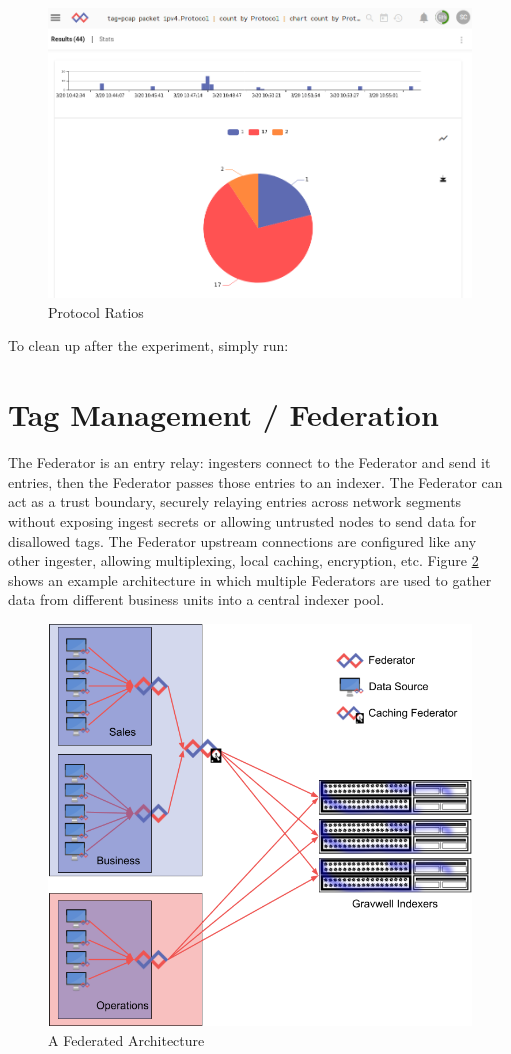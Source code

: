 \begin{figure}
	\includegraphics{images/igst-pcap-lab3.png}
	\caption{Protocol Ratios}
	\label{fig:pcap-lab3}
\end{figure}

To clean up after the experiment, simply run:



\section{Tag Management / Federation}
\label{sec:federator}

The Federator is an entry relay: ingesters connect to the Federator and
send it entries, then the Federator passes those entries to an indexer.
The Federator can act as a trust boundary, securely relaying entries
across network segments without exposing ingest secrets or allowing
untrusted nodes to send data for disallowed tags. The Federator upstream
connections are configured like any other ingester, allowing
multiplexing, local caching, encryption, etc. Figure \ref{fig:federation}
shows an example architecture in which multiple Federators are used
to gather data from different business units into a central indexer pool.

\begin{figure}
	\includegraphics[width=0.75\linewidth]{images/federated-architecture.png}
	\caption{A Federated Architecture}
	\label{fig:federation}
\end{figure}

